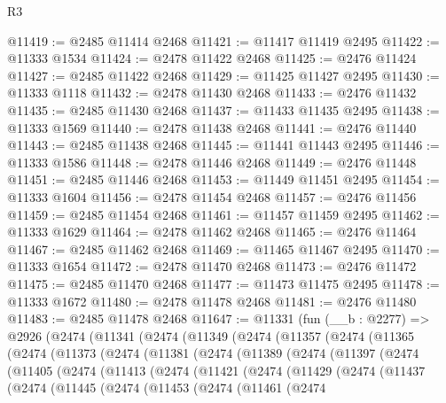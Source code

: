 \begin{lexlean}{R3}
\begin{coremodule}
@11419 := @2485 @11414 @2468
@11421 := @11417 @11419 @2495
@11422 := @11333 @1534
@11424 := @2478 @11422 @2468
@11425 := @2476 @11424
@11427 := @2485 @11422 @2468
@11429 := @11425 @11427 @2495
@11430 := @11333 @1118
@11432 := @2478 @11430 @2468
@11433 := @2476 @11432
@11435 := @2485 @11430 @2468
@11437 := @11433 @11435 @2495
@11438 := @11333 @1569
@11440 := @2478 @11438 @2468
@11441 := @2476 @11440
@11443 := @2485 @11438 @2468
@11445 := @11441 @11443 @2495
@11446 := @11333 @1586
@11448 := @2478 @11446 @2468
@11449 := @2476 @11448
@11451 := @2485 @11446 @2468
@11453 := @11449 @11451 @2495
@11454 := @11333 @1604
@11456 := @2478 @11454 @2468
@11457 := @2476 @11456
@11459 := @2485 @11454 @2468
@11461 := @11457 @11459 @2495
@11462 := @11333 @1629
@11464 := @2478 @11462 @2468
@11465 := @2476 @11464
@11467 := @2485 @11462 @2468
@11469 := @11465 @11467 @2495
@11470 := @11333 @1654
@11472 := @2478 @11470 @2468
@11473 := @2476 @11472
@11475 := @2485 @11470 @2468
@11477 := @11473 @11475 @2495
@11478 := @11333 @1672
@11480 := @2478 @11478 @2468
@11481 := @2476 @11480
@11483 := @2485 @11478 @2468
@11647 := @11331
    (fun (__b : @2277) =>
    @2926
      (@2474
        (@11341
          (@2474
            (@11349
              (@2474
                (@11357
                  (@2474
                    (@11365
                      (@2474
                        (@11373
                          (@2474
                            (@11381
                              (@2474
                                (@11389
                                  (@2474
                                    (@11397
                                      (@2474
                                        (@11405
                                          (@2474
                                            (@11413
                                              (@2474
                                                (@11421
                                                  (@2474
                                                    (@11429
                                                      (@2474
                                                        (@11437
                                                          (@2474
                                                            (@11445
                                                              (@2474
                                                                (@11453
                                                                  (@2474
                                                                    (@11461
                                                                      (@2474

\end{coremodule}
\end{lexlean}
